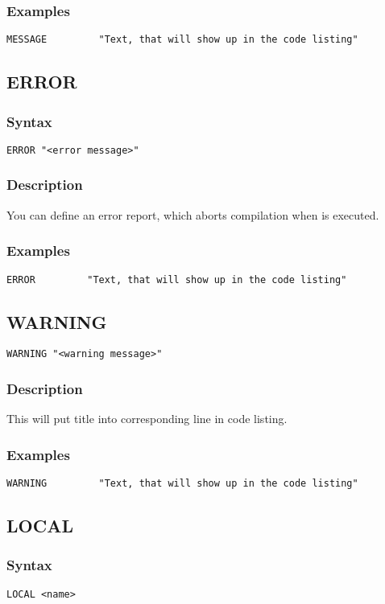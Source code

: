         \subsubsection{Examples}
            \verb'MESSAGE         "Text, that will show up in the code listing"'

    \subsection{ERROR}
        \subsubsection{Syntax}
            \verb'ERROR "<error message>"'

        \subsubsection{Description}
            You can define an error report, which aborts compilation when is executed.

        \subsubsection{Examples}
            \verb'ERROR         "Text, that will show up in the code listing"'

    \subsection{WARNING}
            \verb'WARNING "<warning message>"'

        \subsubsection{Description}
            This will put title into corresponding line in code listing.

        \subsubsection{Examples}
            \verb'WARNING         "Text, that will show up in the code listing"'

    \subsection{LOCAL}
        \subsubsection{Syntax}
            \verb'LOCAL <name>'

